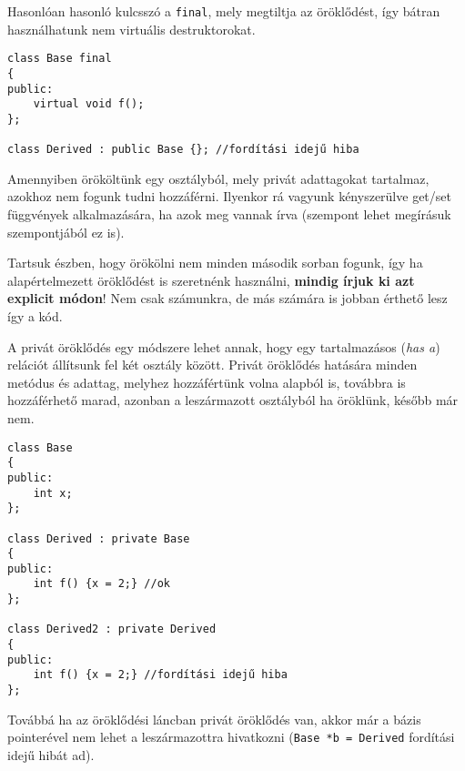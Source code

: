 \documentclass[a4paper,11.5pt,table]{article}
\begin{document}
	\smallskip
	Hasonlóan hasonló kulcsszó a \texttt{final}, mely megtiltja az öröklődést, így bátran használhatunk nem virtuális destruktorokat.
	
	\begin{lstlisting}
class Base final
{
public:
	virtual void f();
};

class Derived : public Base {}; //fordítási idejű hiba
	\end{lstlisting}
	Amennyiben örököltünk egy osztályból, mely privát adattagokat tartalmaz, azokhoz nem fogunk tudni hozzáférni. Ilyenkor rá vagyunk kényszerülve get/set függvények alkalmazására, ha azok meg vannak írva (szempont lehet megírásuk szempontjából ez is).
	
	\medskip
	Tartsuk észben, hogy örökölni nem minden második sorban fogunk, így ha alapértelmezett öröklődést is szeretnénk használni, \textbf{mindig írjuk ki azt explicit módon}! Nem csak számunkra, de más számára is jobban érthető lesz így a kód.
	
	\medskip
	A privát öröklődés egy módszere lehet annak, hogy egy tartalmazásos (\textit{has a}) relációt állítsunk fel két osztály között. Privát öröklődés hatására minden metódus és adattag, melyhez hozzáfértünk volna alapból is, továbbra is hozzáférhető marad, azonban a leszármazott osztályból ha öröklünk, később már nem.
	\begin{lstlisting}
class Base
{
public:
	int x;
};

class Derived : private Base
{
public:
	int f() {x = 2;} //ok
};

class Derived2 : private Derived
{
public:
	int f() {x = 2;} //fordítási idejű hiba
};
	\end{lstlisting}
	Továbbá ha az öröklődési láncban privát öröklődés van, akkor már a bázis pointerével nem lehet a leszármazottra hivatkozni (\texttt{Base *b = Derived} fordítási idejű hibát ad).
	\medskip
	
\end{document}
